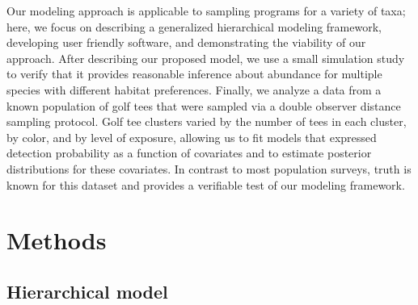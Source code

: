 \documentclass[10pt]{article}
\begin{document}
Our modeling approach is applicable to sampling programs for a variety of taxa; here, we focus on describing a generalized hierarchical modeling framework, developing user friendly software, and demonstrating the viability of our approach.  After describing our proposed model, we use a small simulation study to verify that it provides reasonable inference about abundance for multiple species with different habitat preferences.  Finally, we analyze a data from a known population of golf tees that were sampled via a double observer distance sampling protocol.  Golf tee clusters varied by the number of tees in each cluster, by color, and by level of exposure, allowing us to fit models that expressed detection probability as a function of covariates and to estimate posterior distributions for these covariates. In contrast to most population surveys, truth is known for this dataset and provides a verifiable test of our modeling framework.



\section*{Methods}

\subsection*{Hierarchical model}
\end{document}
